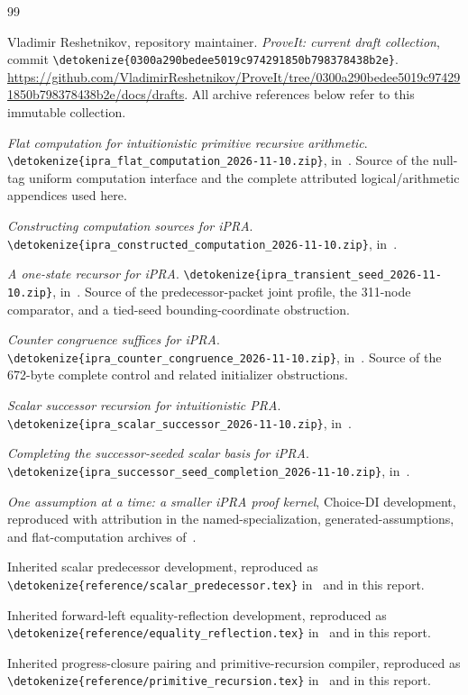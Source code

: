 \documentclass[11pt,letterpaper]{article}
\theoremstyle{definition}\newtheorem{definition}[theorem]{Definition}
\theoremstyle{remark}\newtheorem{remark}[theorem]{Remark}
\newcommand{\file}[1]{\expandafter\nolinkurl\expandafter{\detokenize{#1}}}
\begin{document}
\clearpage
\begin{thebibliography}{99}
\raggedright
{}
Vladimir Reshetnikov, repository maintainer.
\emph{ProveIt: current draft collection}, commit
\file{0300a290bedee5019c974291850b798378438b2e}.
\url{https://github.com/VladimirReshetnikov/ProveIt/tree/0300a290bedee5019c974291850b798378438b2e/docs/drafts}.
All archive references below refer to this immutable collection.

\emph{Flat computation for intuitionistic primitive recursive arithmetic}.
\file{ipra_flat_computation_2026-11-10.zip}, in~\cite{snapshot}.
Source of the null-tag uniform computation interface and the complete
attributed logical/arithmetic appendices used here.

\emph{Constructing computation sources for iPRA}.
\file{ipra_constructed_computation_2026-11-10.zip}, in~\cite{snapshot}.

\emph{A one-state recursor for iPRA}.
\file{ipra_transient_seed_2026-11-10.zip}, in~\cite{snapshot}.
Source of the predecessor-packet joint profile, the 311-node comparator,
and a tied-seed bounding-coordinate obstruction.

\emph{Counter congruence suffices for iPRA}.
\file{ipra_counter_congruence_2026-11-10.zip}, in~\cite{snapshot}.
Source of the 672-byte complete control and related initializer obstructions.

\emph{Scalar successor recursion for intuitionistic PRA}.
\file{ipra_scalar_successor_2026-11-10.zip}, in~\cite{snapshot}.

\emph{Completing the successor-seeded scalar basis for iPRA}.
\file{ipra_successor_seed_completion_2026-11-10.zip}, in~\cite{snapshot}.

\emph{One assumption at a time: a smaller iPRA proof kernel},
Choice-DI development, reproduced with attribution in the named-specialization,
generated-assumptions, and flat-computation archives of~\cite{snapshot}.

Inherited scalar predecessor development, reproduced as
\file{reference/scalar_predecessor.tex} in~\cite{flat} and in this report.

Inherited forward-left equality-reflection development, reproduced as
\file{reference/equality_reflection.tex} in~\cite{flat} and in this report.

Inherited progress-closure pairing and primitive-recursion compiler,
reproduced as \file{reference/primitive_recursion.tex} in~\cite{flat}
and in this report.
\end{thebibliography}

\end{document}
